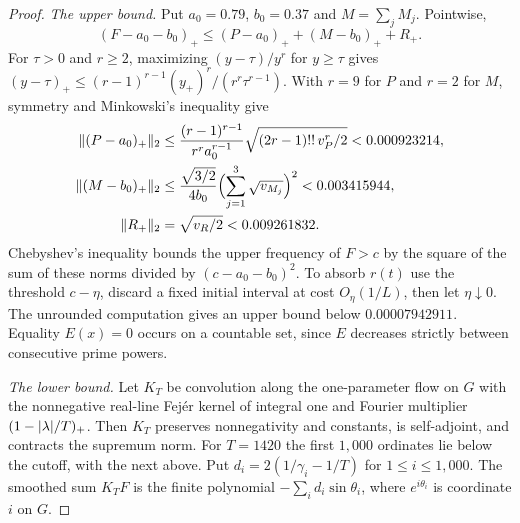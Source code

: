 \begin{proof}
\emph{The upper bound.} Put $a_0=0.79$, $b_0=0.37$ and $M=\sum_jM_j$. Pointwise,
\[
 (F-a_0-b_0)_+\le(P-a_0)_++(M-b_0)_++R_+ .
\]
For $\tau>0$ and $r\ge2$, maximizing $(y-\tau)/y^r$ for $y\ge\tau$ gives
$(y-\tau)_+\le(r-1)^{r-1}(y_+)^r/(r^r\tau^{r-1})$. With $r=9$ for $P$ and $r=2$ for $M$,
symmetry and Minkowski's inequality give
\begin{align*}
 \lVert(P-a_0)_+\rVert_2&\le\frac{(r-1)^{r-1}}{r^ra_0^{r-1}}\sqrt{(2r-1)!!\,v_P^r/2}
   <0.000923214,\\
 \lVert(M-b_0)_+\rVert_2&\le\frac{\sqrt{3/2}}{4b_0}\Bigl(\sum_{j=1}^3\sqrt{v_{M_j}}\Bigr)^2
   <0.003415944,\\
 \lVert R_+\rVert_2&=\sqrt{v_R/2}<0.009261832 .
\end{align*}
Chebyshev's inequality bounds the upper frequency of $F>c$ by the square of the sum of
these norms divided by $(c-a_0-b_0)^2$. To absorb $r(t)$ use the threshold $c-\eta$,
discard a fixed initial interval at cost $O_\eta(1/L)$, then let $\eta\downarrow0$. The
unrounded computation gives an upper bound below $0.00007942911$. Equality $E(x)=0$ occurs
on a countable set, since $E$ decreases strictly between consecutive prime powers.

\emph{The lower bound.} Let $K_T$ be convolution along the one-parameter flow on $G$ with
the nonnegative real-line Fej\'er kernel of integral one and Fourier multiplier
$(1-\lvert\lambda\rvert/T)_+$. Then $K_T$ preserves nonnegativity and constants, is self-adjoint,
and contracts the supremum norm. For $T=1420$ the first $1{,}000$ ordinates lie below the
cutoff, with the next above. Put $d_i=2(1/\gamma_i-1/T)$ for $1\le i\le1{,}000$. The
smoothed sum $K_TF$ is the finite polynomial $-\sum_id_i\sin\theta_i$, where
$e^{i\theta_i}$ is coordinate $i$ on $G$.


\end{proof}
